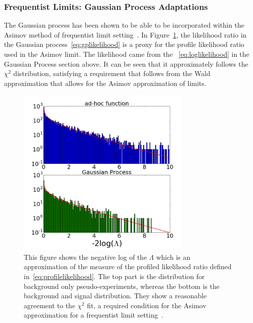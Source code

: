 %


\subsubsection{Frequentist Limits: Gaussian Process Adaptations}
    The Gaussian process has been  shown to be able to be incorporated within the Asimov method of frequentist limit setting~\cite{frate2017modeling}.
    In Figure~\ref{fig:chi2}, the likelihood ratio in the Gaussian process~\ref{eq:gplikelihood} is a proxy for the profile likelihood ratio used in the Asimov limit. The likelihood came from the ~\ref{eq:loglikelihood} in the Gaussian Process section above.  It can be seen that it approximately follows the $\chi^{2}$ distribution, satisfying a requirement that follows from the Wald approximation that allows for the Asimov approximation of limits.

    \begin{figure}[!htb]
        \begin{center}
            \includegraphics[width=0.75\textwidth]{figures/chapter_analysismethod/chi2}
                \caption{
                This figure shows the negative log of the $\Lambda$ which is an approximation of the measure of the profiled likelihood ratio defined in~\ref{eq:profilelikelihood}. The top part is the distribution for background only pseudo-experiments, whereas the bottom is the background and signal distribution. They show a reasonable agreement to the $\chi^{2}$ fit, a required condition for the Asimov approximation for a frequentist limit setting~\cite{frate2017modeling}. 
            }
            \label{fig:chi2}
        \end{center}
    \end{figure}
    \FloatBarrier

